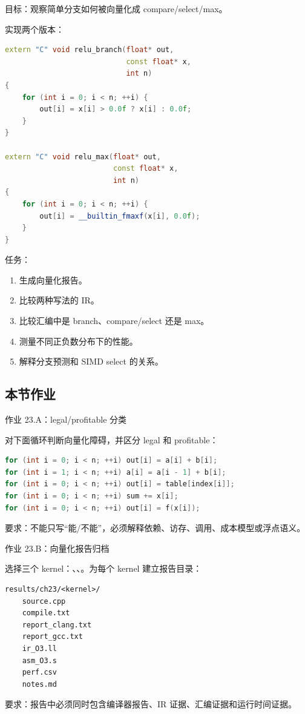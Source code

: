 \begin{labbox}
目标：观察简单分支如何被向量化成 compare/select/max。

实现两个版本：

\begin{lstlisting}[language=C++]
extern "C" void relu_branch(float* out,
                            const float* x,
                            int n)
{
    for (int i = 0; i < n; ++i) {
        out[i] = x[i] > 0.0f ? x[i] : 0.0f;
    }
}

extern "C" void relu_max(float* out,
                         const float* x,
                         int n)
{
    for (int i = 0; i < n; ++i) {
        out[i] = __builtin_fmaxf(x[i], 0.0f);
    }
}
\end{lstlisting}

任务：

\begin{enumerate}
  \item 生成向量化报告。
  \item 比较两种写法的 IR。
  \item 比较汇编中是 branch、compare/select 还是 max。
  \item 测量不同正负数分布下的性能。
  \item 解释分支预测和 SIMD select 的关系。
\end{enumerate}
\end{labbox}

\subsection{本节作业}

\begin{exercisebox}
作业 23.A：legal/profitable 分类

对下面循环判断向量化障碍，并区分 legal 和 profitable：

\begin{lstlisting}[language=C++]
for (int i = 0; i < n; ++i) out[i] = a[i] + b[i];
for (int i = 1; i < n; ++i) a[i] = a[i - 1] + b[i];
for (int i = 0; i < n; ++i) out[i] = table[index[i]];
for (int i = 0; i < n; ++i) sum += x[i];
for (int i = 0; i < n; ++i) out[i] = f(x[i]);
\end{lstlisting}

要求：不能只写“能/不能”，必须解释依赖、访存、调用、成本模型或浮点语义。
\end{exercisebox}

\begin{exercisebox}
作业 23.B：向量化报告归档

选择三个 kernel：、、。为每个 kernel 建立报告目录：

\begin{lstlisting}
results/ch23/<kernel>/
    source.cpp
    compile.txt
    report_clang.txt
    report_gcc.txt
    ir_O3.ll
    asm_O3.s
    perf.csv
    notes.md
\end{lstlisting}

要求：报告中必须同时包含编译器报告、IR 证据、汇编证据和运行时间证据。
\end{exercisebox}

